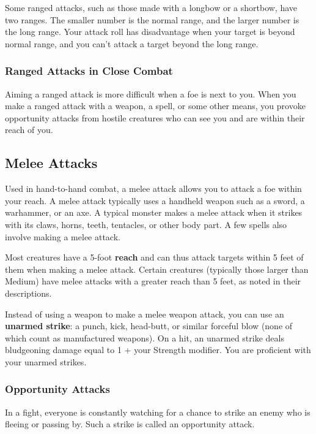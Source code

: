 Some ranged attacks, such as those made with a longbow or a shortbow, have two ranges. The smaller number is the normal range, and the larger number is the long range. Your attack roll has disadvantage when your target is beyond normal range, and you can't attack a target beyond the long range.

\subsubsection{Ranged Attacks in Close Combat}

Aiming a ranged attack is more difficult when a foe is next to you. When you make a ranged attack with a weapon, a spell, or some other means, you provoke opportunity attacks from hostile creatures who can see you and are within their reach of you.

\subsection{Melee Attacks}

Used in hand-to-hand combat, a melee attack allows you to attack a foe within your reach. A melee attack typically uses a handheld weapon such as a sword, a warhammer, or an axe. A typical monster makes a melee attack when it strikes with its claws, horns, teeth, tentacles, or other body part. A few spells also involve making a melee attack.

Most creatures have a 5-foot \textbf{reach} and can thus attack targets within 5 feet of them when making a melee attack. Certain creatures (typically those larger than Medium) have melee attacks with a greater reach than 5 feet, as noted in their descriptions.

Instead of using a weapon to make a melee weapon attack, you can use an \textbf{unarmed strike}: a punch, kick, head-butt, or similar forceful blow (none of which count as manufactured weapons). On a hit, an unarmed strike deals bludgeoning damage equal to 1 + your Strength modifier. You are proficient with your unarmed strikes.

\subsubsection{Opportunity Attacks}\label{sec:opportunity-attacks}

In a fight, everyone is constantly watching for a chance to strike an enemy who is fleeing or passing by. Such a strike is called an opportunity attack.

